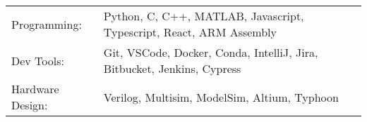 \begin{tabularx}{\linewidth}{@{}l X@{}}
Programming: &  \normalsize{Python, C, C++, MATLAB, Javascript, Typescript, React, ARM Assembly}\\
Dev Tools:  &  \normalsize{Git, VSCode, Docker, Conda, IntelliJ, Jira, Bitbucket, Jenkins, Cypress}\\
Hardware Design: & \normalsize{Verilog, Multisim, ModelSim, Altium, Typhoon} \\
\end{tabularx}